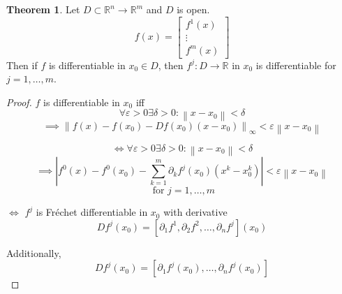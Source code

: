\documentclass[a4paper,landscape,twocolumn]{article}
\theoremstyle{definition}
\newtheorem{theorem}{Theorem}
\newcommand\abs[1]{\left|#1\right|}
\newcommand\norm[1]{\left\|#1\right\|}
\newcommand\inorm[1]{\left\|#1\right\|_\infty}
\begin{document}
\begin{theorem}
  Let $D \subset \mathbb R^n \to \mathbb R^m$ and $D$ is open.
  \[
    f(x) = \begin{bmatrix}
      f^1(x) \\ \vdots \\ f^m(x)
    \end{bmatrix}
  \]
  Then if $f$ is differentiable in $x_0 \in D$,
  then $f^j: D \to \mathbb R$ in $x_0$ is differentiable for $j = 1, \ldots, m$.
\end{theorem}
\begin{proof}
  $f$ is differentiable in $x_0$ iff
  \[\forall \varepsilon > 0 \exists \delta > 0: \norm{x - x_0} < \delta \]
  \[ \implies \inorm{f(x) - f(x_0) - Df(x_0) (x - x_0)} < \varepsilon \norm{x - x_0} \]

  \[ \iff \forall \varepsilon > 0 \exists \delta > 0: \norm{x - x_0} < \delta \]
  \[ \implies \abs{f^0(x) - f^0(x_0) - \sum_{k=1}^m \partial_k f^j(x_0)(x^k - x_0^k)} < \varepsilon \norm{x - x_0} \]
  \[ \text{ for } j = 1, \ldots, m \]

  $\iff$ $f^j$ is Fr\'echet differentiable in $x_0$ with derivative
  \[ Df^j(x_0) = [\partial_1 f^1, \partial_2 f^2, \ldots, \partial_n f^j](x_0) \]

  Additionally,
  \[ Df^j(x_0) = [\partial_1 f^j(x_0), \ldots, \partial_n f^j(x_0)] \]
\end{proof}
\end{document}
